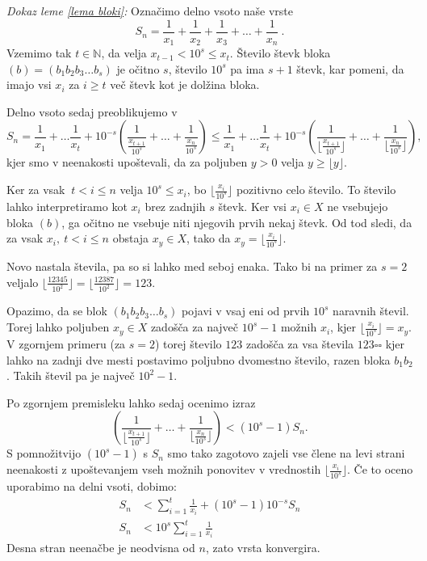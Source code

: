 \documentclass[a4paper,12pt]{article}
\def\N{\mathbb{N}} %
\begin{document}
\noindent
{\em Dokaz leme \ref{lema bloki}:\/} 
Označimo delno vsoto naše vrste 
\[ S_n = \frac{1}{x_1} + \frac{1}{x_2} + \frac{1}{x_3} + \dots + \frac{1}{x_n} \ . \]
Vzemimo tak $t \in \N $, da velja $x_{t-1} < 10^s \leq x_t$. Število števk bloka $(b) = (b_1b_2b_3 \dots b_s)$
je očitno $s$, število $10^s$ pa ima $s+1$ števk, kar pomeni, da imajo vsi $x_i$ za $i \geq t$
več števk kot je dolžina bloka. 

Delno vsoto sedaj preoblikujemo v
\[ S_n = \frac{1}{x_1} + \dots \frac{1}{x_t} + 10^{-s}(\frac{1}{\frac{x_{t + 1}}{10^s}} + \dots + \frac{1}{\frac{x_n}{10^s}})
    \leq \frac{1}{x_1} + \dots \frac{1}{x_t} + 10^{-s}(\frac{1}{ \lfloor\frac{x_{t + 1}}{10^s}\rfloor} + \dots + \frac{1}{\lfloor\frac{x_n}{10^s}\rfloor}) ,
\]
kjer smo v neenakosti upoštevali, da za poljuben $y > 0$ velja $y \geq \lfloor y \rfloor$.

Ker za vsak $\ t < i \leq n$ velja $10^s \leq x_i$, bo $\lfloor \frac{x_i}{10^s} \rfloor$ pozitivno celo število.
To število lahko interpretiramo kot $x_i$ brez zadnjih $s$ števk. Ker vsi $x_i \in X$
ne vsebujejo bloka $(b)$, ga očitno ne vsebuje niti njegovih prvih nekaj števk. 
Od tod sledi, da za vsak $x_i, \ t < i \leq n$ obstaja $x_y \in X$,
tako da $ x_y = \lfloor \frac{x_i}{10^s} \rfloor$.

Novo nastala števila, pa so si lahko med seboj enaka. Tako bi na primer za $s=2$ veljalo 
$ \lfloor\frac{12345}{10^2}\rfloor = \lfloor \frac{12387}{10^2}\rfloor = 123$.

Opazimo, da se blok $(b_1b_2b_3 \dots b_s)$ pojavi v vsaj eni od prvih $10^s$ naravnih števil.
Torej lahko poljuben $x_y \in X$ zadošča za največ $10^s - 1$ možnih $x_i$, kjer $\lfloor \frac{x_i}{10^s} \rfloor = x_y$.
V zgornjem primeru (za $s=2$) torej število $123$ zadošča za vsa števila $123 \square \square$
kjer lahko na zadnji dve mesti postavimo poljubno dvomestno število, razen bloka $b_1b_2$.
Takih števil pa je največ $10^2 - 1$.

Po zgornjem premisleku lahko sedaj ocenimo izraz 
\[(\frac{1}{ \lfloor\frac{x_{t + 1}}{10^s}\rfloor} + \dots + \frac{1}{\lfloor\frac{x_n}{10^s}\rfloor}) < (10^s - 1)S_n.\]
S pomnožitvijo $(10^s - 1)$ s $S_n$ smo tako zagotovo zajeli vse člene na levi strani neenakosti
z upoštevanjem vseh možnih ponovitev v vrednostih $\lfloor\frac{x_i}{10^s}\rfloor$.
Če to oceno uporabimo na delni vsoti, dobimo:
\[
    \begin{split}
    S_n &< \sum_{i=1}^t \frac{1}{x_i} + (10^s - 1)10^{-s}S_n \\
    S_n &< 10^s \sum_{i=1}^t \frac{1}{x_i}
    \end{split}
    \]
Desna stran neenačbe je neodvisna od $n$, zato vrsta konvergira.
\end{document}
